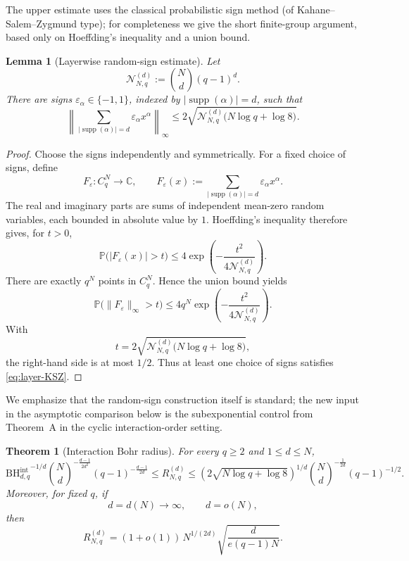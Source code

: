 \documentclass[11pt,a4paper]{article}
\numberwithin{equation}{section}
\theoremstyle{cleanplain}
\newtheorem{theorem}{Theorem}[section]
\newtheorem{lemma}[lemma]{Lemma}
\theoremstyle{cleandefinition}
\theoremstyle{cleanremark}
\newcommand{\C}{\mathbb C}
\newcommand{\supp}{\operatorname{supp}}
\newcommand{\BHint}[2]{\mathrm{BH}^{\mathrm{int}}_{#1,#2}}
\begin{document}
{\color{black}The upper estimate uses the classical probabilistic sign method (of Kahane--Salem--Zygmund type); for completeness we give the short finite-group argument, based only on Hoeffding's inequality and a union bound.}
\begin{lemma}[Layerwise random-sign estimate]\label{lem:layer-KSZ}
Let
\[
 \mathcal N_{N,q}^{(d)}:=\binom Nd(q-1)^d.
\]
There are signs $\varepsilon_\alpha\in\{-1,1\}$, indexed by
$|\supp(\alpha)|=d$, such that
\begin{equation}\label{eq:layer-KSZ}
 \left\|
 \sum_{|\supp(\alpha)|=d}\varepsilon_\alpha x^\alpha
 \right\|_\infty
 \leq 2\sqrt{\mathcal N_{N,q}^{(d)}\bigl(N\log q+\log 8\bigr)}.
\end{equation}
\end{lemma}

\begin{proof}
Choose the signs independently and symmetrically.  For a fixed choice of signs, define
\[
 F_\varepsilon:C_q^N\longrightarrow\C,
 \qquad
 F_\varepsilon(x)
 :=\sum_{|\supp(\alpha)|=d}\varepsilon_\alpha x^\alpha.
\]
The real and imaginary parts are sums of independent mean-zero random
variables, each bounded in absolute value by $1$.  Hoeffding's inequality \cite{Hoeffding}
therefore gives, for $t>0$,
\[
 \mathbb P\bigl(|F_\varepsilon(x)|>t\bigr)
 \leq
 4\exp\left(-\frac{t^2}{4\mathcal N_{N,q}^{(d)}}\right).
\]
There are exactly $q^N$ points in $C_q^N$.  Hence the union bound yields
\[
 \mathbb P\bigl(\|F_\varepsilon\|_\infty>t\bigr)
 \leq
 4q^N\exp\left(-\frac{t^2}{4\mathcal N_{N,q}^{(d)}}\right).
\]
With
\[
 t=2\sqrt{\mathcal N_{N,q}^{(d)}\bigl(N\log q+\log 8\bigr)},
\]
the right-hand side is at most $1/2$.  Thus at least one choice of signs
satisfies \eqref{eq:layer-KSZ}.
\end{proof}

{\color{black}We emphasize that the random-sign construction itself is standard; the new
input in the asymptotic comparison below is the subexponential control from
Theorem~A in the cyclic interaction-order setting.}

\begin{theorem}[Interaction Bohr radius]\label{thm:bohr-radius}
For every $q\geq2$ and $1\leq d\leq N$,
\begin{equation}\label{eq:bohr-two-sided}
 {\BHint{d}{q}}^{-1/d}
 \binom Nd^{-\frac{d-1}{2d^2}}
 (q-1)^{-\frac{d-1}{2d}}
 \leq R_{N,q}^{(d)}
 \leq
 \left(2\sqrt{N\log q+\log 8}\right)^{1/d}
 \binom Nd^{-\frac1{2d}}
 (q-1)^{-1/2}.
\end{equation}
Moreover, for fixed $q$, if
\begin{equation}\label{eq:bohr-general-regime}
 d=d(N)\to\infty,
 \qquad d=o(N),
\end{equation}
then
\begin{equation}\label{eq:bohr-general-asymptotic}
 \boxed{
 R_{N,q}^{(d)}
 =(1+o(1))\,N^{1/(2d)}
 \sqrt{\frac{d}{e(q-1)N}}.}
\end{equation}
\end{theorem}
\end{document}
